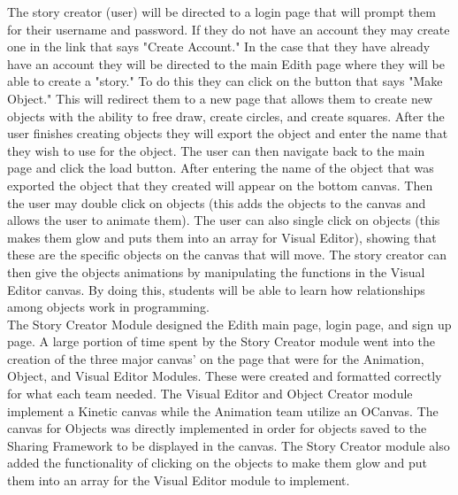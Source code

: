 \documentclass[12pt]{article}
\begin{document}
The story creator (user) will be directed to a login page that will prompt them for their username and password.  If they do not have an account they may create one in the link that says "Create Account."  In the case that they have already have an account they will be directed to the main Edith page where they will be able to create a "story." To do this they can click on the button that says "Make Object."  This will redirect them to a new page that allows them to create new objects with the ability to free draw, create circles, and create squares.  After the user finishes creating objects they will export the object and enter the name that they wish to use for the object.  The user can then navigate back to the main page and click the load button.  After entering the name of the object that was exported the object that they created will appear on the bottom canvas.  Then the user may double click on objects (this adds the objects to the canvas and allows the user to animate them).  The user can also single click on objects (this makes them glow and puts them into an array for Visual Editor), showing that these are the specific objects on the canvas that will move.  The story creator can then give the objects animations by manipulating the functions in the Visual Editor canvas. By doing this, students will be able to learn how relationships among objects work in programming. \\

The Story Creator Module designed the Edith main page, login page, and sign up page.  A large portion of time spent by the Story Creator module went into the creation of the three major canvas' on the page that were for the Animation, Object, and Visual Editor Modules.  These were created and formatted correctly for what each team needed.  The Visual Editor and Object Creator module implement a Kinetic canvas while the Animation team utilize an OCanvas.  The canvas for Objects was directly implemented in order for objects saved to the Sharing Framework to be displayed in the canvas.  The Story Creator module also added the functionality of clicking on the objects to make them glow and put them into an array for the Visual Editor module to implement.   


\end{document}
